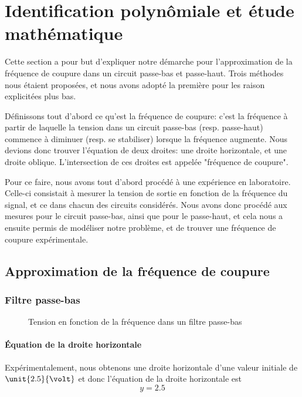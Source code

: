 
\section{Identification polynômiale et étude mathématique}

Cette section a pour but d'expliquer notre démarche pour l'approximation de la fréquence de coupure dans un circuit passe-bas et passe-haut. Trois méthodes nous étaient proposées, et nous avons adopté la première pour les raison explicitées plus bas.

Définissons tout d'abord ce qu'est la fréquence de coupure: c'est la fréquence à partir de laquelle la tension dans un circuit passe-bas (resp. passe-haut) commence à diminuer (resp. se stabiliser) lorsque la fréquence augmente.
Nous devions donc trouver l'équation de deux droites: une droite horizontale, et une droite oblique. L'intersection de ces droites est appelée "fréquence de coupure".

Pour ce faire, nous avons tout d'abord procédé à une expérience en laboratoire.
Celle-ci consistait à mesurer la tension de sortie en fonction de la fréquence du signal, et ce dans chacun des circuits considérés.
Nous avons donc procédé aux mesures pour le circuit passe-bas, ainsi que pour le passe-haut, et cela nous a ensuite permis de modéliser notre problème, et de trouver une fréquence de coupure expérimentale.

\subsection{Approximation de la fréquence de coupure}
\subsubsection{Filtre passe-bas}

\begin{figure}[h]
   \centering
   
  \caption{\label{premierebissectrice}Tension en fonction de la fréquence dans un filtre passe-bas}
\end{figure}

\paragraph{Équation de la droite horizontale} %
Expérimentalement, nous obtenons une droite horizontale d'une valeur initiale de $\unit{2.5}{\volt}$ et donc l'équation de la droite horizontale est \[y=2.5\]

